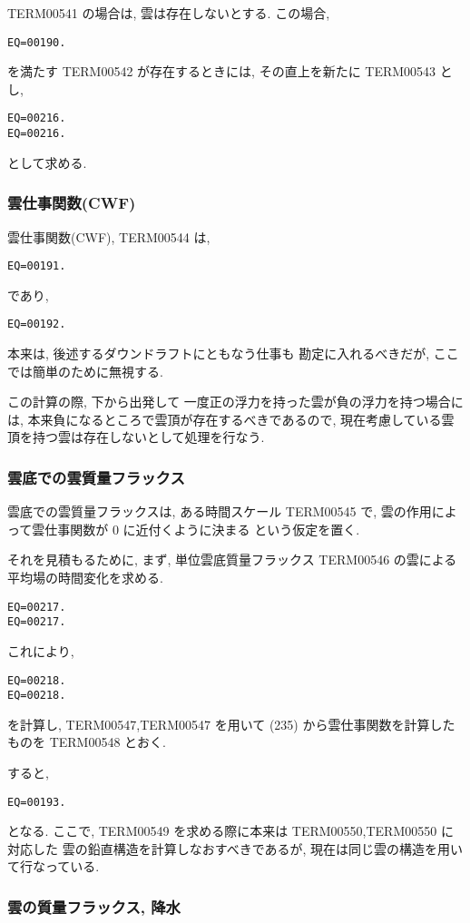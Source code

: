 TERM00541 の場合は,
雲は存在しないとする. この場合,
\begin{verbatim}
EQ=00190.
\end{verbatim}
を満たす TERM00542 が存在するときには,
その直上を新たに TERM00543 とし,
\begin{verbatim}
EQ=00216.
EQ=00216.
\end{verbatim}
として求める.

\subsubsection{雲仕事関数(CWF)}

雲仕事関数(CWF), TERM00544 は,
\begin{verbatim}
EQ=00191.
\end{verbatim}
であり,
\begin{verbatim}
EQ=00192.
\end{verbatim}
本来は, 後述するダウンドラフトにともなう仕事も
勘定に入れるべきだが, ここでは簡単のために無視する.

この計算の際, 下から出発して
一度正の浮力を持った雲が負の浮力を持つ場合には,
本来負になるところで雲頂が存在するべきであるので,
現在考慮している雲頂を持つ雲は存在しないとして処理を行なう.

\subsubsection{雲底での雲質量フラックス}

雲底での雲質量フラックスは,
ある時間スケール TERM00545 で,
雲の作用によって雲仕事関数が 0 に近付くように決まる
という仮定を置く.

それを見積もるために, まず, 単位雲底質量フラックス TERM00546 の雲による
平均場の時間変化を求める.
\begin{verbatim}
EQ=00217.
EQ=00217.
\end{verbatim}
これにより,
\begin{verbatim}
EQ=00218.
EQ=00218.
\end{verbatim}
を計算し, TERM00547,TERM00547 を用いて
(235) から雲仕事関数を計算したものを TERM00548 とおく.

すると,
\begin{verbatim}
EQ=00193.
\end{verbatim}
となる.
ここで, TERM00549 を求める際に本来は TERM00550,TERM00550 に対応した
雲の鉛直構造を計算しなおすべきであるが, 
現在は同じ雲の構造を用いて行なっている.

\subsubsection{雲の質量フラックス, 降水}

